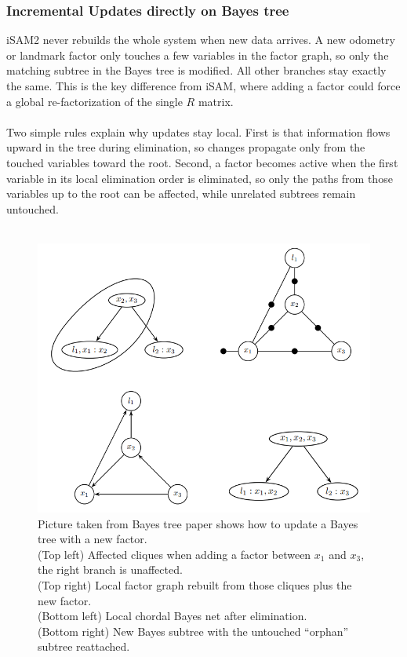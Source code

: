 \subsubsection{Incremental Updates directly on Bayes tree}
iSAM2 never rebuilds the whole system when new data arrives. A new odometry or landmark factor only touches a few variables in the factor graph, so only the matching subtree in the Bayes tree is modified. All other branches stay exactly the same. This is the key difference from iSAM, where adding a factor could force a global re-factorization of the single $R$ matrix.
\\ \\
Two simple rules explain why updates stay local. First is that information flows upward in the tree during elimination, so changes propagate only from the touched variables toward the root. Second, a factor becomes active when the first variable in its local elimination order is eliminated, so only the paths from those variables up to the root can be affected, while unrelated subtrees remain untouched.
\\ \\
\begin{figure}[H]
    \centering
    \includegraphics[width=0.98\linewidth]{Pictures/Optimizers/iSAM2/updating_Bayes_tree.png}
    \caption{Picture taken from Bayes tree paper \cite{Bayes_tree_for_SLAM_paper} shows how to update a Bayes tree with a new factor. \\ \noindent 
    (Top left) Affected cliques when adding a factor between $x_1$ and $x_3$, the right branch is unaffected. \\ \noindent
    (Top right) Local factor graph rebuilt from those cliques plus the new factor. \\ \noindent
    (Bottom left) Local chordal Bayes net after elimination. \\ \noindent
    (Bottom right) New Bayes subtree with the untouched ``orphan'' subtree reattached.}
    \label{fig:optimizer-iSAM2-R-update-tree}
\end{figure}
